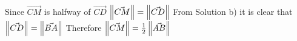 Since $\vec{CM}$ is halfway of $\vec{CD}$
\newline
$\left\lVert\vec{CM}\right\rVert=\left\lVert\vec{CD}\right\rVert$
\newline
From Solution b) it is clear that $\left\lVert\vec{CD}\right\rVert=\left\lVert\vec{BA}\right\rVert$
\newline
Therefore $\left\lVert\vec{CM}\right\rVert=\frac{1}{2}\left\lVert\vec{AB}\right\rVert$